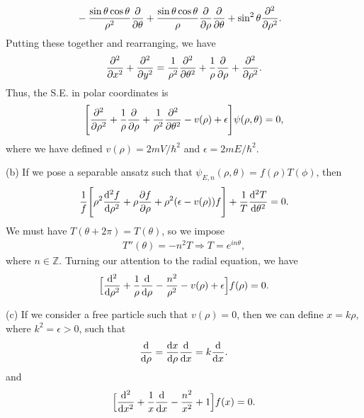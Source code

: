 {\begin{align}
               &- \frac{\sin{\theta} \cos{\theta}}{\rho^2} \pdv{\theta} + \frac{\sin{\theta} \cos{\theta}}{\rho} \pdv{\rho} \pdv{\theta} + \sin^2{\theta} \pdv[2]{\rho}
.\end{align}
Putting these together and rearranging, we have
\begin{align}
    \pdv[2]{x} + \pdv[2]{y} = \frac{1}{\rho^2} \pdv[2]{\theta} + \frac{1}{\rho} \pdv{\rho} + \pdv[2]{\rho}
.\end{align}
Thus, the S.E. in polar coordinates is
\begin{eqnarray}
    \Bigg[ \pdv[2]{\rho} + \frac{1}{\rho} \pdv{\rho} + \frac{1}{\rho^2} \pdv[2]{\theta} - v(\rho) + \epsilon \Bigg] \psi(\rho,\theta) = 0
,\end{eqnarray}
where we have defined $v(\rho) = 2mV/\hbar^2$ and $\epsilon = 2mE/\hbar^2$.

(b) If we pose a separable ansatz such that $\psi_{E,n}(\rho,\theta) = f(\rho) T(\phi)$, then
\begin{align}
    \frac{1}{f} \Bigg[ \rho^2 \dv[2]{f}{\rho} + \rho \pdv{f}{\rho} + \rho^2 (\epsilon - v(\rho)) f \Bigg] + \frac{1}{T} \dv[2]{T}{\theta} = 0
.\end{align}
We must have $T(\theta + 2\pi) = T(\theta)$, so we impose
\begin{eqnarray}
    T''(\theta)  = -n^2 T \Rightarrow T = e^{in\theta}
,\end{eqnarray}
where $n \in \mathbb{Z}$.
Turning our attention to the radial equation, we have
\begin{align}
    \Big[ \dv[2]{\rho} + \frac{1}{\rho} \dv{\rho} - \frac{n^2}{\rho^2} - v(\rho) + \epsilon \Big] f(\rho) = 0
.\end{align}

(c) If we consider a free particle such that $v(\rho) = 0$, then we can define $x = k \rho$, where $k^2 = \epsilon > 0$, such that
\begin{align}
    \dv{\rho} = \dv{x}{\rho} \dv{x} = k \dv{x}
.\end{align}
and
\begin{align}
    \Big[ \dv[2]{x} + \frac{1}{x} \dv{x} - \frac{n^2}{x^2} + 1 \Big] f(x) = 0
.\end{align}

}
